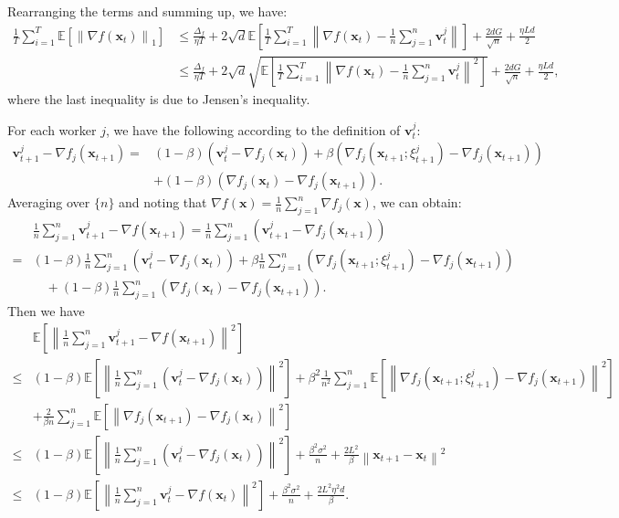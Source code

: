 \documentclass{article}
\newcommand{\E}{\mathbb{E}}
\newcommand{\Norm}[1]{\left\|#1\right\|}
\def \E {\mathbb{E}}
\def \v {\mathbf{v}}
\def \x {\mathbf{x}}
\def \E {\mathbb{E}}
\def \x {\mathbf{x}}
\def \v {\mathbf{v}}
\begin{document}
Rearranging the terms and summing up, we have:
\begin{align*}
     \frac{1}{T} \sum_{i=1}^{T} \E \left[\left\| \nabla f(\x_t) \right\|_1 \right]&\leq \frac{\Delta_f}{\eta T} +2\sqrt{d}\E\left[\frac{1}{T} \sum_{i=1}^{T} \left\| \nabla f(\x_t) - \frac{1}{n}\sum_{j=1}^{n}\v_t^j  \right\|\right]+ \frac{2d G}{\sqrt{n}} + \frac{\eta L d}{2} \\
     &\leq \frac{\Delta_f}{\eta T} +2\sqrt{d}\sqrt{\E\left[\frac{1}{T} \sum_{i=1}^{T} \left\| \nabla f(\x_t) - \frac{1}{n}\sum_{j=1}^{n}\v_t^j  \right\|^2 \right]}+ \frac{2d G}{\sqrt{n}} + \frac{\eta L d}{2},
\end{align*}
where the last inequality is due to Jensen's inequality.




For each worker $j$, we have the following according to the definition of $\v_t^j$:
\begin{align*}
    \v_{t+1}^j - \nabla f_j(\x_{t+1})
     = &(1-\beta)\left(\v_t^j - \nabla f_j(\x_t)\right) + \beta \left(\nabla f_j(\x_{t+1};\xi_{t+1}^{j}) - \nabla f_j(\x_{t+1})\right)\\
    & + (1-\beta)  \left( \nabla f_j(\x_{t}) - \nabla f_j(\x_{t+1}) \right).
\end{align*}
Averaging over $\{n\}$ and noting that $\nabla f(\x) = \frac{1}{n}\sum_{j=1}^n \nabla f_j(\x)$, we can obtain:
\begin{align*}
    &\frac{1}{n}\sum_{j=1}^n \v_{t+1}^j - \nabla f(\x_{t+1}) = \frac{1}{n}\sum_{j=1}^n \left(\v_{t+1}^j - \nabla f_j(\x_{t+1})\right)\\
     = &(1-\beta)\frac{1}{n}\sum_{j=1}^n \left(\v_t^j - \nabla f_j(\x_t)\right) + \beta \frac{1}{n}\sum_{j=1}^n \left(\nabla f_j(\x_{t+1};\xi_{t+1}^{j}) - \nabla f_j(\x_{t+1})\right)\\
    & \quad + (1-\beta) \frac{1}{n}\sum_{j=1}^n \left(\nabla f_j(\x_{t}) - \nabla f_j(\x_{t+1}) \right).
\end{align*}
Then we have
\begin{align*}
     & \E\left[\left\|\frac{1}{n}\sum_{j=1}^n \v_{t+1}^j - \nabla f(\x_{t+1})\right\|^2\right]\\
     \leq &(1-\beta)\E\left[\Norm{ \frac{1}{n}\sum_{j=1}^n\left(\v_{t}^j - \nabla f_j(\x_{t})\right)}^2\right]+ \beta^2 \frac{1}{n^2}\sum_{j=1}^n\E\left[\Norm{ \nabla f_j(\x_{t+1};\xi_{t+1}^{j}) - \nabla f_j(\x_{t+1})}^2\right]\\
     & +\frac{2}{\beta n}\sum_{j=1}^n\E\left[\Norm{ \nabla f_j(\x_{t+1}) - \nabla f_j(\x_{t})}^2\right]\\
     \leq &(1-\beta)\E\left[\Norm{\frac{1}{n}\sum_{j=1}^n \left(\v_{t}^j - \nabla f_j(\x_{t})\right)}^2\right] + \frac{\beta^2\sigma^2}{n} + \frac{2L^2}{\beta}\Norm{\x_{t+1}-\x_t}^2\\
     \leq &(1-\beta)\E\left[\Norm{\frac{1}{n}\sum_{j=1}^n \v_{t}^j - \nabla f(\x_{t})}^2\right] + \frac{\beta^2\sigma^2}{n} + \frac{2L^2\eta^2 d}{\beta}.
\end{align*}
\end{document}
